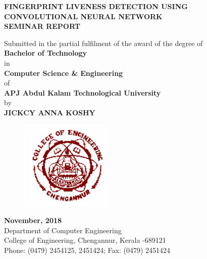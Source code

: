 \documentclass[a4paper,12pt,oneside]{article}
\begin{document}
\thispagestyle{empty}
\begin{center}

\large{\textbf{{FINGERPRINT LIVENESS DETECTION USING CONVOLUTIONAL NEURAL NETWORK}}}
\setlength{\baselineskip}{1.5\baselineskip}
\\

\vspace{5mm}
\textbf{SEMINAR REPORT}

Submitted in the partial fulfilment of the award of the degree
of
\\
\textbf{Bachelor of Technology}
\\
in
\\
\textbf{Computer Science \& Engineering}
\\
of
\\
\textbf{APJ Abdul Kalam Technological University}
\\
by
\\
\textbf{JICKCY ANNA KOSHY}
\\
\vspace{5mm}
\begin{figure}[H]
	\centering
	\includegraphics{ceclogo.png}
\end{figure}
\textbf{November, 2018}
\vspace{8mm}
\\
Department of Computer Engineering
\\
College of Engineering, Chengannur, Kerala -689121
\\
Phone: (0479) 2454125, 2451424; Fax: (0479) 2451424
\\



\end{center}
\newpage
\thispagestyle{empty}
\end{document}
